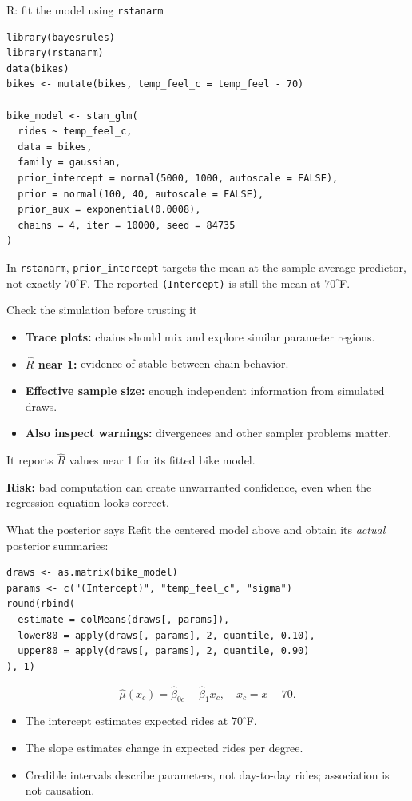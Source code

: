 \documentclass[aspectratio=43,11pt]{beamer}
\begin{document}
\begin{frame}[fragile]{R: fit the model using \texttt{rstanarm}}
\footnotesize
\begin{verbatim}
library(bayesrules)
library(rstanarm)
data(bikes)
bikes <- mutate(bikes, temp_feel_c = temp_feel - 70)

bike_model <- stan_glm(
  rides ~ temp_feel_c,
  data = bikes,
  family = gaussian,
  prior_intercept = normal(5000, 1000, autoscale = FALSE),
  prior = normal(100, 40, autoscale = FALSE),
  prior_aux = exponential(0.0008),
  chains = 4, iter = 10000, seed = 84735
)
\end{verbatim}
\par\smallskip\scriptsize
In \texttt{rstanarm}, \texttt{prior\_intercept} targets the mean at the
sample-average predictor, not exactly $70^\circ$F. The reported
\texttt{(Intercept)} is still the mean at $70^\circ$F.
\end{frame}

\begin{frame}{Check the simulation before trusting it}
\begin{itemize}
\item \textbf{Trace plots:} chains should mix and explore similar parameter regions.
\item \textbf{$\widehat R$ near 1:} evidence of stable between-chain behavior.
\item \textbf{Effective sample size:} enough independent information from simulated draws.
\item \textbf{Also inspect warnings:} divergences and other sampler problems matter.
\end{itemize}
It reports $\widehat R$ values near 1 for its fitted bike model.
\par\medskip\textbf{Risk:} bad computation can create unwarranted confidence, even when the regression equation looks correct.
\end{frame}

\begin{frame}[fragile]{What the posterior says}
\small
Refit the centered model above and obtain its \emph{actual} posterior summaries:
\begin{verbatim}
draws <- as.matrix(bike_model)
params <- c("(Intercept)", "temp_feel_c", "sigma")
round(rbind(
  estimate = colMeans(draws[, params]),
  lower80 = apply(draws[, params], 2, quantile, 0.10),
  upper80 = apply(draws[, params], 2, quantile, 0.90)
), 1)
\end{verbatim}
\[\widehat\mu(x_c)=\widehat\beta_{0c}+\widehat\beta_1x_c,\quad x_c=x-70.\]
\begin{itemize}
\item The intercept estimates expected rides at $70^\circ$F.
\item The slope estimates change in expected rides per degree.
\item Credible intervals describe parameters, not day-to-day rides; association is not causation.
\end{itemize}
\end{frame}
\end{document}
